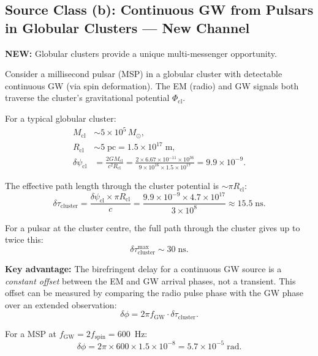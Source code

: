\documentclass[11pt]{article}
\theoremstyle{definition}
\theoremstyle{remark}
\newcommand{\ee}[1]{\times10^{#1}}
\newcommand{\Msun}{M_\odot}
\newcommand{\newresult}[1]{\textcolor{green!50!black}{\textbf{NEW:} #1}}
\begin{document}
\subsection{Source Class (b): Continuous GW from Pulsars in Globular
Clusters --- New Channel}

\newresult{Globular clusters provide a unique multi-messenger
opportunity.}

Consider a millisecond pulsar (MSP) in a globular cluster with
detectable continuous GW (via spin deformation). The EM (radio)
and GW signals both traverse the cluster's gravitational potential
$\Phi_{\mathrm{cl}}$.

For a typical globular cluster:
\begin{align}
M_{\mathrm{cl}} &\sim 5\ee{5}\,\Msun, \\
R_{\mathrm{cl}} &\sim 5\;\mathrm{pc} = 1.5\ee{17}\;\mathrm{m}, \\
\delta\psi_{\mathrm{cl}} &= \frac{2GM_{\mathrm{cl}}}{c^2 R_{\mathrm{cl}}}
= \frac{2 \times 6.67\ee{-11} \times 10^{36}}{9\ee{16} \times 1.5\ee{17}}
= 9.9\ee{-9}.
\end{align}

The effective path length through the cluster potential is
$\sim \pi R_{\mathrm{cl}}$:
\begin{equation}
\delta\tau_{\mathrm{cluster}} = \frac{\delta\psi_{\mathrm{cl}}
\times \pi R_{\mathrm{cl}}}{c}
= \frac{9.9\ee{-9} \times 4.7\ee{17}}{3\ee{8}}
\approx 15.5\;\mathrm{ns}.
\label{eq:cluster-biref}
\end{equation}

For a pulsar at the cluster centre, the full path through the cluster
gives up to twice this:
\begin{equation}
\delta\tau_{\mathrm{cluster}}^{\mathrm{max}} \sim 30\;\mathrm{ns}.
\end{equation}

\textbf{Key advantage:} The birefringent delay for a continuous GW
source is a \emph{constant offset} between the EM and GW arrival
phases, not a transient. This offset can be measured by comparing the
radio pulse phase with the GW phase over an extended observation:
\begin{equation}
\delta\phi = 2\pi f_{\mathrm{GW}} \cdot \delta\tau_{\mathrm{cluster}}.
\end{equation}

For a MSP at $f_{\mathrm{GW}} = 2 f_{\mathrm{spin}} = 600$~Hz:
\begin{equation}
\delta\phi = 2\pi \times 600 \times 1.5\ee{-8}
= 5.7\ee{-5}\;\mathrm{rad}.
\end{equation}
\end{document}
